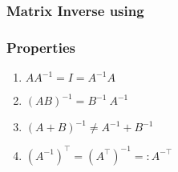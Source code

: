 \subsubsection{Matrix Inverse using }



\subsubsection{Properties}

\begin{multicols}{2}
\begin{enumerate}
    \item $AA^{-1} = I = A^{-1}A$
    \hfill \cite{mfml/book/mml/Deisenroth-Faisal-Ong}

    \item $(AB)^{-1} = B^{-1}\ A^{-1}$
    \hfill \cite{mfml/book/mml/Deisenroth-Faisal-Ong}

    \item $(A + B)^{-1} \neq A^{-1} + B^{-1}$
    \hfill \cite{mfml/book/mml/Deisenroth-Faisal-Ong}

    \item $(A^{-1})^\top = (A^\top)^{-1} =: A^{-\top}$
    \hfill \cite{mfml/book/mml/Deisenroth-Faisal-Ong}
    
\end{enumerate}
\end{multicols}

